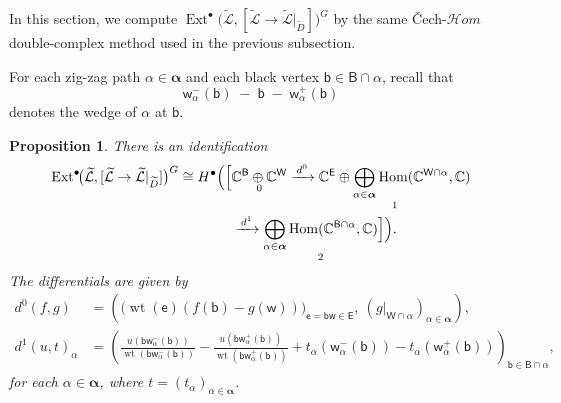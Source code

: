\documentclass[dvipsnames,11pt]{article}
\newtheorem{proposition}[theorem]{Proposition}
\theoremstyle{definition}
\newcommand{\wt}{\operatorname{wt}}
\newcommand{\C}{{\mathbb C}}
\def\B{\mathsf B}
\def\W{\mathsf W}
\def\w{\mathsf w}
\def\b{\mathsf b}
\def\e{\mathsf e}
\def\E{\mathsf E}
\def\zz{\bm \alpha}
\def\Ext{\operatorname{Ext}}
\def\Ext{\operatorname{Ext}}
\DeclareMathOperator{\Hom}{Hom}
\begin{document}
In this section, we compute $\Ext^\bullet\!\bigl(\widetilde{\mathcal L},[\widetilde{\mathcal L}\to \widetilde{\mathcal L}|_{\widetilde D}]\bigr)^G$ by the same \v{C}ech-$\mathcal Hom$ double-complex method used in the previous subsection.

For each zig-zag path \(\alpha\in\zz\) and each black vertex \(\b\in \B\cap\alpha\), recall that
\[
\w_\alpha^{-}(\b)\;-\;\b\;-\;\w_\alpha^{+}(\b)
\]
denotes the wedge of \(\alpha\) at \(\b\). 

\begin{proposition}\label{prop:repextld}
There is an identification
\begin{equation}\label{eq:Fbullet-concrete}
\begin{aligned}
\Ext^\bullet\!\bigl(\widetilde{\mathcal L},[\widetilde{\mathcal L}\to \widetilde{\mathcal L}|_{\widetilde D}]\bigr)^G
\cong
H^\bullet\Bigl(\Bigl[
&
\underset{0}{\C^{\B}\oplus \C^{\W}}
\xrightarrow{\,d^{0}\,}
\underset{1}{\C^{\E}\oplus \displaystyle\bigoplus_{\alpha\in\zz}\Hom(\C^{\W\cap\alpha},\C)}\\
&\xrightarrow{\,d^{1}\,}
\underset{2}{\displaystyle\bigoplus_{\alpha\in\zz}\Hom(\C^{\B\cap\alpha},\C)}
\Bigr]\Bigr).
\end{aligned}
\end{equation}
The differentials are given by
\begin{align*}
d^{0}(f,g)
&=
\left(
\bigl(\wt(\e)(f(\b)-g(\w))\bigr)_{\e=\b\w\in\E},
\ (g|_{\W\cap\alpha})_{\alpha\in\zz}
\right),\\
d^{1}(u,t)_\alpha
&=
\left(
\frac{u(\b \w_\alpha^{-}(\b))}{\wt(\b \w_\alpha^{-}(\b))}
-
\frac{u(\b \w_\alpha^{+}(\b))}{\wt(\b \w_\alpha^{+}(\b))}
+
t_\alpha(\w_\alpha^{-}(\b))
-
t_\alpha(\w_\alpha^{+}(\b))
\right)_{\b\in \B\cap\alpha},
\end{align*}
for each \(\alpha\in\zz\), where \(t=(t_\alpha)_{\alpha\in\zz}\). 
\end{proposition}
\end{document}
